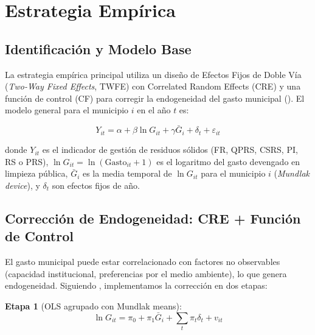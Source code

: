 
\section{Estrategia Empírica}
\label{sec:estrategia}

\subsection{Identificación y Modelo Base}
\label{sec:identificacion}

La estrategia empírica principal utiliza un diseño de Efectos Fijos de Doble Vía (\textit{Two-Way Fixed Effects}, TWFE) con Correlated Random Effects (CRE) y una función de control (CF) para corregir la endogeneidad del gasto municipal (\citealt{Wooldridge2015}).
El modelo general para el municipio $i$ en el año $t$ es:

\begin{equation}
  Y_{it} = \alpha + \beta \ln G_{it} + \gamma \bar{G}_{i} + \delta_{t} + \varepsilon_{it}
  \label{eq:modelo_base}
\end{equation}

\noindent donde $Y_{it}$ es el indicador de gestión de residuos sólidos (FR, QPRS, CSRS, PI, RS o PRS),
$\ln G_{it} = \ln(\text{Gasto}_{it} + 1)$ es el logaritmo del gasto devengado en limpieza pública,
$\bar{G}_{i}$ es la media temporal de $\ln G_{it}$ para el municipio $i$ (\textit{Mundlak device}),
y $\delta_{t}$ son efectos fijos de año.

\subsection{Corrección de Endogeneidad: CRE + Función de Control}
\label{sec:cre_cf}

El gasto municipal puede estar correlacionado con factores no observables (capacidad institucional, preferencias por el medio ambiente), lo que genera endogeneidad.
Siguiendo \citet{Wooldridge2015}, implementamos la corrección en dos etapas:

\textbf{Etapa 1} (OLS agrupado con Mundlak means):
\begin{equation}
  \ln G_{it} = \pi_0 + \pi_1 \bar{G}_{i} + \sum_t \pi_t \delta_t + v_{it}
  \label{eq:stage1}
\end{equation}


